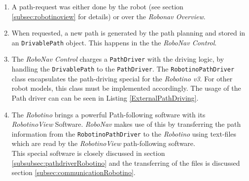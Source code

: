 \begin{enumerate}
\item A path-request was either done by the robot (see section \ref{subsec:robotinoview} for details) or over the \textit{Robonav Overview}.
\item When requested, a new path is generated by the path planning and stored in an \texttt{DrivablePath} object. This happens in the the \textit{RoboNav Control}. 
\item The \textit{RoboNav Control} charges a \texttt{PathDriver} with the driving logic, by handling the \texttt{DrivablePath} to the \texttt{PathDriver}. The \texttt{RobotinoPathDriver} class encapsulates the path-driving special for the \textit{Robotino v3}. For other robot models, this class must be implemented accordingly. The usage of the Path driver can can be seen in Listing  \ref{ExternalPathDriving}.
\item The \textit{Robotino} brings a powerful Path-following software with its \textit{RobotinoView} Software. \textit{RoboNav} makes use of this by transferring the path information from the \texttt{RobotinoPathDriver} to the \textit{Robotino} using text-files which are read by the \textit{RobotinoView} path-following software. \\
This special software is closely discussed in section \ref{subsubsec:pathdriverRobotino} and the transferring of the files is discussed section \ref{subsec:communicationRobotino}.
\end{enumerate}
